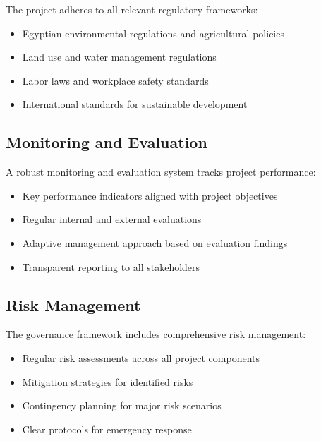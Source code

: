 The project adheres to all relevant regulatory frameworks:

\begin{itemize}
    \item Egyptian environmental regulations and agricultural policies
    \item Land use and water management regulations
    \item Labor laws and workplace safety standards
    \item International standards for sustainable development
\end{itemize}

\subsection{Monitoring and Evaluation}

A robust monitoring and evaluation system tracks project performance:

\begin{itemize}
    \item Key performance indicators aligned with project objectives
    \item Regular internal and external evaluations
    \item Adaptive management approach based on evaluation findings
    \item Transparent reporting to all stakeholders
\end{itemize}

\subsection{Risk Management}

The governance framework includes comprehensive risk management:

\begin{itemize}
    \item Regular risk assessments across all project components
    \item Mitigation strategies for identified risks
    \item Contingency planning for major risk scenarios
    \item Clear protocols for emergency response
\end{itemize} 